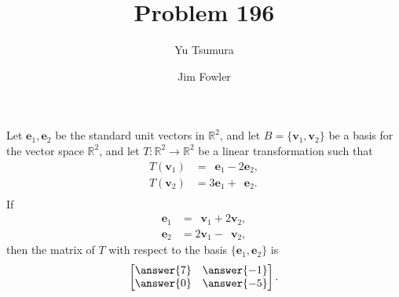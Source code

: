 \documentclass{ximera}
\title{Problem 196}
\author{Yu Tsumura \and Jim Fowler}
\begin{document}
\begin{problem}

  Let $\mathbf{e}_1, \mathbf{e}_2$ be the standard unit vectors in $\mathbb{R}^2$,
  and let $B=\{\mathbf{v}_1, \mathbf{v}_2 \}$ be a basis for the vector
  space $\mathbb{R}^2$, and let $T:\mathbb{R}^2 \to \mathbb{R}^2$ be a linear transformation
  such that
  \begin{align*}
    T(\mathbf{v}_1) &=\phantom{1}\mathbf{e}_1 - 2 \mathbf{e}_2, \\
    T(\mathbf{v}_2) &=3\mathbf{e}_1 + \phantom{1} \mathbf{e}_2. \\
  \end{align*}
  If
  \begin{align*}
    \mathbf{e}_1 &=\phantom{1}\mathbf{v}_1+2\mathbf{v}_2, \\
    \mathbf{e}_2 &=2\mathbf{v}_1-\phantom{1}\mathbf{v}_2,
  \end{align*}
  then the matrix of $T$ with respect to the basis $\{\mathbf{e}_1, \mathbf{e}_2\}$ is
  \[
    \begin{bmatrix}
      \answer{7} & \answer{-1} \\
      \answer{0} & \answer{-5}
    \end{bmatrix}.
  \]

\end{problem}	
	
\end{document}
